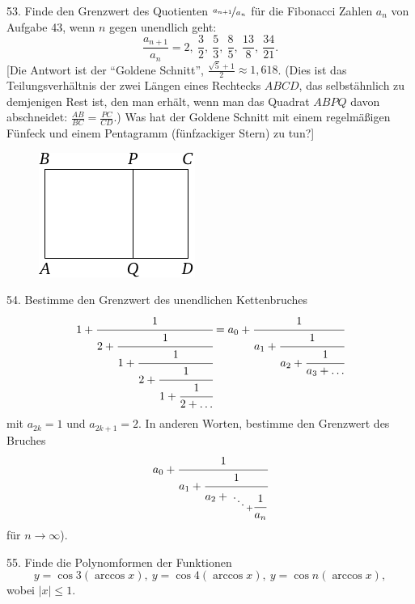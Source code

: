 \begin{problem}{53.}
	Finde den Grenzwert des Quotienten $\nicefrac{a_{n+1}}{a_n}$ für die Fibonacci Zahlen $a_n$ von Aufgabe 43, wenn $n$ gegen unendlich geht:
	\begin{equation*}
		\frac{a_{n+1}}{a_n}=2,\ \frac 32,\ \frac53, \ \frac85, \ \frac{13}8,
		\ \frac{34}{21}.
	\end{equation*}
	[Die Antwort ist der \enquote{Goldene Schnitt},
	$\frac{\sqrt{5}+1}{2} \approx 1{,}618$. (Dies ist das Tei\-lungs\-ver\-hält\-nis der zwei Längen eines Rechtecks $ABCD$, das selbstähnlich zu demjenigen Rest ist, den man erhält, wenn man das Quadrat $ABPQ$ davon abschneidet:
	$\frac{AB}{BC}=\frac{PC}{CD}$.) Was hat der Goldene Schnitt mit einem regelmäßigen Fünfeck und einem Pentagramm (fünfzackiger Stern) zu tun?]
	\begin{figure}
		\includegraphics{resources/taskbook-37}
	\end{figure}
\end{problem}

\begin{problem}{54.}
	Bestimme den Grenzwert des unendlichen Kettenbruches
	\begin{equation*}
		1+\cfrac{1}{2+\cfrac{1}{1+\cfrac{1}{2+\cfrac{1}{1+\cfrac{1}{2+\ldots}}}}}=
		a_0+\cfrac{1}{a_1+\cfrac{1}{a_2+\cfrac{1}{a_3+\dots}}}
	\end{equation*}
	mit $a_{2k}=1$ und $a_{2k+1}=2$. In anderen Worten, bestimme den Grenzwert des Bruches
	\begin{equation*}
		a_0+\cfrac{1}{a_1+\cfrac{1}{a_2+{\atop{\ddots \atop {}} + \cfrac{1}{a_n}}}}
	\end{equation*}
	für $n \to \infty$).
\end{problem}

\begin{problem}{55.}
	Finde die Polynomformen der Funktionen
	\begin{equation*}
		y=\cos 3 (\arccos x),\ y=\cos 4 (\arccos x),\
		y=\cos n (\arccos x),
	\end{equation*}
	wobei $|x| \leqslant 1$.
\end{problem}

